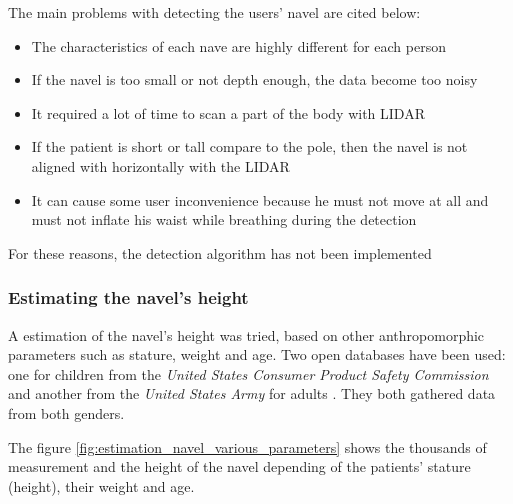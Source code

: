 \documentclass{article}
\newcommand{\vsp}{\vspace{\baselineskip}}
\begin{document}
The main problems with detecting the users' navel are cited below:

\begin{itemize}
    \item The characteristics of each nave are highly different for each person
    \item If the navel is too small or not depth enough, the data become too noisy
    \item It required a lot of time to scan a part of the body with LIDAR
    \item If the patient is short or tall compare to the pole, then the navel is not aligned with horizontally with the LIDAR
    \item It can cause some user inconvenience because he must not move at all and must not inflate his waist while breathing during the detection
\end{itemize}

For these reasons, the detection algorithm has not been implemented

\subsubsection{Estimating the navel's height}

A estimation of the navel's height was tried, based on other anthropomorphic parameters such as stature, weight and age. Two open databases have been used: one for children from the \textit{United States Consumer Product Safety Commission} \cite{database_cpsc_children} and another from the \textit{United States Army} for adults \cite{database_ansur2}. They both gathered data from both genders. 

\vsp

The figure \ref{fig:estimation_navel_various_parameters} shows the thousands of measurement and the height of the navel depending of the patients' stature (height), their weight and age. 
\end{document}
